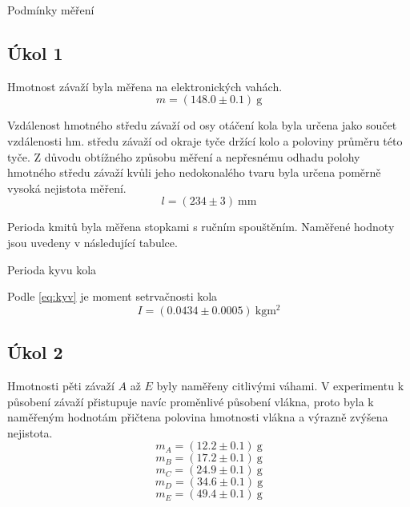 \documentclass[protokol.tex]{subfiles}
\begin{document}

\begin{table}[H] \label{tab:podminky}
\centering
\setlength{\tabcolsep}{10pt}

\caption{Podmínky měření}
\end{table}

\subsection*{Úkol 1}
Hmotnost závaží byla měřena na elektronických vahách.
$$ m = (148.0 \pm 0.1) \ \si{\gram} $$

Vzdálenost hmotného středu závaží od osy otáčení kola byla určena jako součet vzdálenosti hm. středu závaží od okraje tyče držící kolo a poloviny průměru této tyče. Z důvodu obtížného způsobu měření a nepřesnému odhadu polohy hmotného středu závaží kvůli jeho nedokonalého tvaru byla určena poměrně vysoká nejistota měření.
$$ l = (234 \pm 3) \ \si{\milli\metre} $$

Perioda kmitů byla měřena stopkami s ručním spouštěním. Naměřené hodnoty jsou uvedeny v následující tabulce.

\begin{table}[H] \label{tab:kyv}
\centering
\setlength{\tabcolsep}{8pt}

\caption{Perioda kyvu kola}
\end{table}

Podle \eqref{eq:kyv} je moment setrvačnosti kola 
$$ I = (0.0434 \pm 0.0005) \ \si{\kilo\gram\metre\squared} $$

\subsection*{Úkol 2}
Hmotnosti pěti závaží $A$ až $E$ byly naměřeny citlivými váhami. V experimentu k působení závaží přistupuje navíc proměnlivé působení vlákna, proto byla k naměřeným hodnotám přičtena polovina hmotnosti vlákna a výrazně zvýšena nejistota.
$$ m_A = (12.2 \pm 0.1) \ \si{\gram} $$
$$ m_B = (17.2 \pm 0.1) \ \si{\gram} $$
$$ m_C = (24.9 \pm 0.1) \ \si{\gram} $$
$$ m_D = (34.6 \pm 0.1) \ \si{\gram} $$
$$ m_E = (49.4 \pm 0.1) \ \si{\gram} $$  
\end{document}
